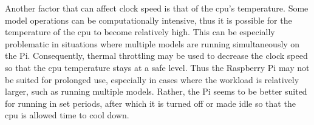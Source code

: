 Another factor that can affect clock speed is that of the cpu's temperature. Some model operations can 
be computationally intensive, thus it is possible for the temperature of the cpu to become relatively 
high. This can be especially problematic in situations where multiple models are running 
simultaneously on the Pi. Consequently, thermal throttling may be used to decrease the clock 
speed so that the cpu temperature stays at a safe level. Thus the Raspberry Pi may not be suited 
for prolonged use, especially in cases where the workload is relatively larger, such as running multiple 
models. Rather, the Pi seems to be better suited for running in set periods, after which it is turned 
off or made idle so that the cpu is allowed time to cool down.
